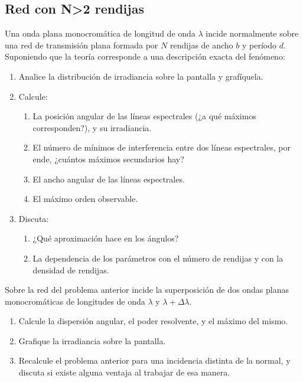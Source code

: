 \subsection*{Red con N\textgreater2 rendijas}

\item Una onda plana monocromática de longitud de onda $\lambda$ incide normalmente sobre una red de transmisión plana formada por $N$ rendijas de ancho $b$ y período $d$.
Suponiendo que la teoría corresponde a una descripción exacta del fenómeno: 
\begin{enumerate}
	\item Analice la distribución de irradiancia sobre la pantalla y grafíquela.
	\item Calcule:
	\begin{enumerate}
		\item La posición angular de las líneas espectrales (¿a qué máximos corresponden?), y su irradiancia.
		\item El número de mínimos de interferencia entre dos líneas espectrales, por ende, ¿cuántos máximos secundarios hay?
		\item El ancho angular de las líneas espectrales.
		\item El máximo orden observable. 
	\end{enumerate}
	\item Discuta: 
	\begin{enumerate}
		\item ¿Qué aproximación hace en los ángulos?
		\item La dependencia de los parámetros con el número de rendijas y con la densidad de rendijas. 
	\end{enumerate}
\end{enumerate}



\item Sobre la red del problema anterior incide la superposición de dos ondas planas monocromáticas de longitudes de onda $\lambda$ y $\lambda+\Delta\lambda$.
\begin{enumerate}
	\item Calcule la dispersión angular, el poder resolvente, y el máximo del mismo.
	\item Grafique la irradiancia sobre la pantalla. 
	\item Recalcule el problema anterior para una incidencia distinta de la normal, y discuta si existe alguna ventaja al trabajar de esa manera. 
\end{enumerate}



